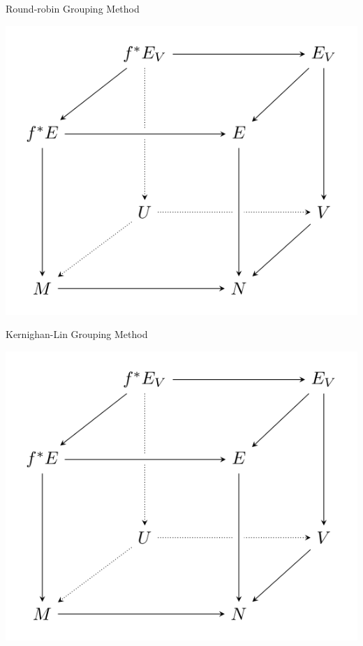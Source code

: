 \documentclass[a0paper,fleqn]{betterposter}
\begin{document}
{Round-robin Grouping Method
\begin{center}
\includegraphics[width=\textwidth]{img/tikzexample2}
\end{center}

Kernighan-Lin Grouping Method
\begin{center}
\includegraphics[width=\textwidth]{img/tikzexample2}
\end{center}

}
\end{document}
